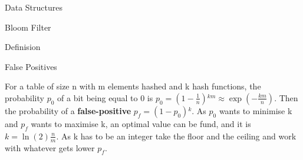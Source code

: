 \documentclass[12pt, letterpaper]{article}
\begin{document}
\begin{section}{Data Structures}
\begin{subsection}{Bloom Filter}
\begin{subsubsection}{Definision}
    \end{subsubsection}

    \begin{subsubsection}{False Positives}

      For a table of size n with m elements hashed and k hash functions, the
      probability \(p_{0}\) of a bit being equal to 0 is \(p_{0} = (1 -
      \frac{1}{n}){}^{km} \approx \exp(-\frac{km}{n})\). Then the probability
      of a \textbf{false-positive} \(p_{f} = (1 - p_{0}){}^{k}\). As \(p_{0}\)
      wants to minimise k and \(p_{f}\) wants to maximise k, an optimal value
      can be fund, and it is \(k = \ln(2) \frac{n}{m}\). As k has to be an
      integer take the floor and the ceiling and work with whatever gets lower
      \(p_{f}\).

    \end{subsubsection}

  \end{subsection}

\end{section}
\end{document}

